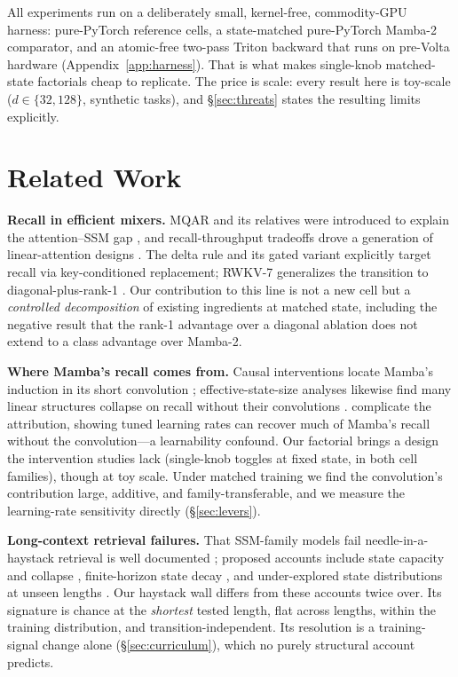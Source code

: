 \documentclass{article}
\begin{document}
All experiments run on a deliberately small, kernel-free, commodity-GPU harness: pure-PyTorch reference cells, a state-matched pure-PyTorch Mamba-2 comparator, and an atomic-free two-pass Triton backward that runs on pre-Volta hardware (Appendix~\ref{app:harness}). That is what makes single-knob matched-state factorials cheap to replicate. The price is scale: every result here is toy-scale ($d\in\{32,128\}$, synthetic tasks), and \S\ref{sec:threats} states the resulting limits explicitly.

\section{Related Work}\label{sec:related}

\textbf{Recall in efficient mixers.} MQAR and its relatives were introduced to explain the attention--SSM gap \citep{arora2023zoology}, and recall-throughput tradeoffs drove a generation of linear-attention designs \citep{arora2024based,katharopoulos2020linear,schlag2021fastweight}. The delta rule \citep{yang2024deltanet} and its gated variant \citep{yang2024gateddeltanet} explicitly target recall via key-conditioned replacement; RWKV-7 generalizes the transition to diagonal-plus-rank-1 \citep{peng2025rwkv7}. Our contribution to this line is not a new cell but a \emph{controlled decomposition} of existing ingredients at matched state, including the negative result that the rank-1 advantage over a diagonal ablation does not extend to a class advantage over Mamba-2.

\textbf{Where Mamba's recall comes from.} Causal interventions locate Mamba's induction in its short convolution \citep{arora2025convs}; effective-state-size analyses likewise find many linear structures collapse on recall without their convolutions \citep{parnichkun2025ess}. \citet{okpekpe2025recall} complicate the attribution, showing tuned learning rates can recover much of Mamba's recall without the convolution---a learnability confound. Our factorial brings a design the intervention studies lack (single-knob toggles at fixed state, in both cell families), though at toy scale. Under matched training we find the convolution's contribution large, additive, and family-transferable, and we measure the learning-rate sensitivity directly (\S\ref{sec:levers}).

\textbf{Long-context retrieval failures.} That SSM-family models fail needle-in-a-haystack retrieval is well documented \citep{hsieh2024ruler,jelassi2024repeat,benkish2024decimamba}; proposed accounts include state capacity and collapse \citep{chen2024stuffedmamba}, finite-horizon state decay \citep{echo2026}, and under-explored state distributions at unseen lengths \citep{lengthgen2025}. Our haystack wall differs from these accounts twice over. Its signature is chance at the \emph{shortest} tested length, flat across lengths, within the training distribution, and transition-independent. Its resolution is a training-signal change alone (\S\ref{sec:curriculum}), which no purely structural account predicts.
\end{document}
